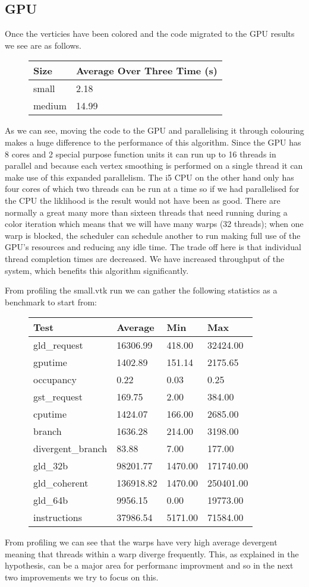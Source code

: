 \subsection*{GPU}
Once the verticies have been colored and the code migrated to the GPU results we see are as follows.\\
\begin{figure}[H]\centering \begin{tabular}{ l | l }
  \hline
  Size & Average Over Three Time (s) \\
  \hline
  \hline
  small & 2.18 \\
  medium & 14.99 \\
  \hline
\end{tabular} \end{figure}

As we can see, moving the code to the GPU and parallelising it through colouring makes a huge difference to the performance of this algorithm. Since the GPU has 8 cores and 2 special purpose function units it can run up to 16 threads in parallel and because each vertex smoothing is performed on a single thread it can make use of this expanded parallelism. The i5 CPU on the other hand only has four cores of which two threads can be run at a time so if we had parallelised for the CPU the liklihood is the result would not have been as good. There are normally a great many more than sixteen threads that need running during a color iteration which means that we will have many warps (32 threads); when one warp is blocked, the scheduler can schedule another to run making full use of the GPU's resources and reducing any idle time.
The trade off here is that individual thread completion times are decreased. We have increased throughput of the system, which benefits this algorithm significantly.

From profiling the small.vtk run we can gather the following statistics as a benchmark to start from:\\
\begin{figure}[H]\centering \begin{tabular}{ l | l | l | l}
\hline
Test & Average & Min & Max \\
\hline
\hline
gld\_request & 16306.99 & 418.00 & 32424.00 \\
gputime & 1402.89 & 151.14 & 2175.65 \\
occupancy & 0.22 & 0.03 & 0.25 \\
gst\_request & 169.75 & 2.00 & 384.00 \\
cputime & 1424.07 & 166.00 & 2685.00 \\
branch & 1636.28 & 214.00 & 3198.00 \\
divergent\_branch & 83.88 & 7.00 & 177.00 \\
gld\_32b & 98201.77 & 1470.00 & 171740.00 \\
gld\_coherent & 136918.82 & 1470.00 & 250401.00 \\
gld\_64b & 9956.15 & 0.00 & 19773.00 \\
instructions & 37986.54 & 5171.00 & 71584.00 \\
\hline
\end{tabular} \end{figure}

From profiling we can see that the warps have very high average devergent meaning that threads within a warp diverge frequently. This, as explained in the hypothesis, can be a major area for performanc improvment and so in the next two improvements we try to focus on this.
